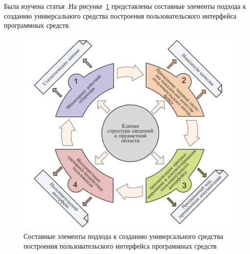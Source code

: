 \def\notedate{2022.10.15}
\def\currentauthor{Василян А.Р. (РК6-73Б)}


Была изучена статья \cite{Kazakov2020}.На рисунке~\ref{rndhpcgui.2022.10.15.scheme1} представлены составные элементы подхода к созданию универсального средства построения пользовательского интерфейса программных средств.

\begin{figure}[!ht]
  \centering
  \includegraphics[scale=0.8]{ResearchNotes/rndhpc_int_gui_2022_10_15/rndhpcgui_2022_10_15_scheme1.png}
  \caption{Составные элементы подхода к созданию универсального средства построения пользовательского интерфейса программных средств}
  \label{rndhpcgui.2022.10.15.scheme1}
\end{figure}

